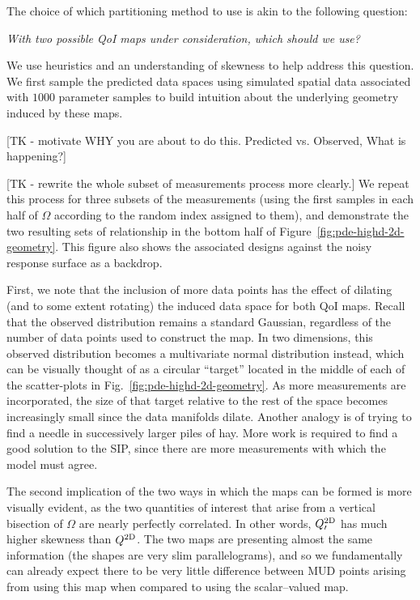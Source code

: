 The choice of which partitioning method to use is akin to the following question:
\begin{center}
\emph{With two possible QoI maps under consideration, which should we use?}
\end{center}

We use heuristics and an understanding of skewness to help address this question.
We first sample the predicted data spaces using simulated spatial data associated with $1000$ parameter samples to build intuition about the underlying geometry induced by these maps.

[TK - motivate WHY you are about to do this. Predicted vs. Observed, What is happening?]

[TK - rewrite the whole subset of measurements process more clearly.]
We repeat this process for three subsets of the measurements (using the first samples in each half of $\Omega$ according to the random index assigned to them), and demonstrate the two resulting sets of relationship in the bottom half of Figure~\ref{fig:pde-highd-2d-geometry}.
This figure also shows the associated designs against the noisy response surface as a backdrop.

First, we note that the inclusion of more data points has the effect of dilating (and to some extent rotating) the induced data space for both QoI maps.
Recall that the observed distribution remains a standard Gaussian, regardless of the number of data points used to construct the map.
In two dimensions, this observed distribution becomes a multivariate normal distribution instead, which can be visually thought of as a circular ``target'' located in the middle of each of the scatter-plots in Fig.~\ref{fig:pde-highd-2d-geometry}.
As more measurements are incorporated, the size of that target relative to the rest of the space becomes increasingly small since the data manifolds dilate.
Another analogy is of trying to find a needle in successively larger piles of hay.
More work is required to find a good solution to the SIP, since there are more measurements with which the model must agree.

The second implication of the two ways in which the maps can be formed is more visually evident, as the two quantities of interest that arise from a vertical bisection of $\Omega$ are nearly perfectly correlated.
In other words, $Q^\text{2D}_\prime$ has much higher skewness than $Q^\text{2D}$.
The two maps are presenting almost the same information (the shapes are very slim parallelograms), and so we fundamentally can already expect there to be very little difference between MUD points arising from using this map when compared to using the scalar--valued map.

